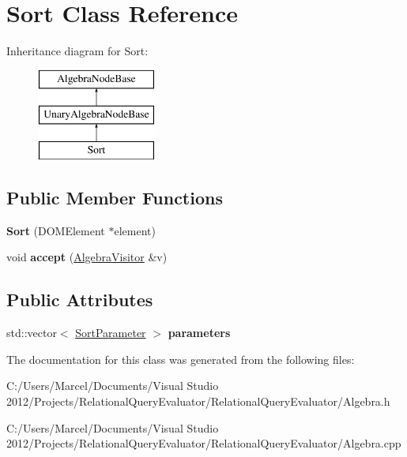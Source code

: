 \hypertarget{class_sort}{\section{Sort Class Reference}
\label{class_sort}
}
Inheritance diagram for Sort\+:\begin{figure}[H]
\begin{center}
\leavevmode
\includegraphics[height=3.000000cm]{class_sort}
\end{center}
\end{figure}
\subsection*{Public Member Functions}
\begin{DoxyCompactItemize}
\item 
\hypertarget{class_sort_a3b177337159d6d3246cd91b033c824c4}{{\bfseries Sort} (D\+O\+M\+Element $\ast$element)}\label{class_sort_a3b177337159d6d3246cd91b033c824c4}

\item 
\hypertarget{class_sort_a488c889b0dff867a125ada831e2c46c2}{void {\bfseries accept} (\hyperlink{class_algebra_visitor}{Algebra\+Visitor} \&v)}\label{class_sort_a488c889b0dff867a125ada831e2c46c2}

\end{DoxyCompactItemize}
\subsection*{Public Attributes}
\begin{DoxyCompactItemize}
\item 
\hypertarget{class_sort_abc86726752639b928cd08812538a251a}{std\+::vector$<$ \hyperlink{class_sort_parameter}{Sort\+Parameter} $>$ {\bfseries parameters}}\label{class_sort_abc86726752639b928cd08812538a251a}

\end{DoxyCompactItemize}


The documentation for this class was generated from the following files\+:\begin{DoxyCompactItemize}
\item 
C\+:/\+Users/\+Marcel/\+Documents/\+Visual Studio 2012/\+Projects/\+Relational\+Query\+Evaluator/\+Relational\+Query\+Evaluator/Algebra.\+h\item 
C\+:/\+Users/\+Marcel/\+Documents/\+Visual Studio 2012/\+Projects/\+Relational\+Query\+Evaluator/\+Relational\+Query\+Evaluator/Algebra.\+cpp\end{DoxyCompactItemize}
